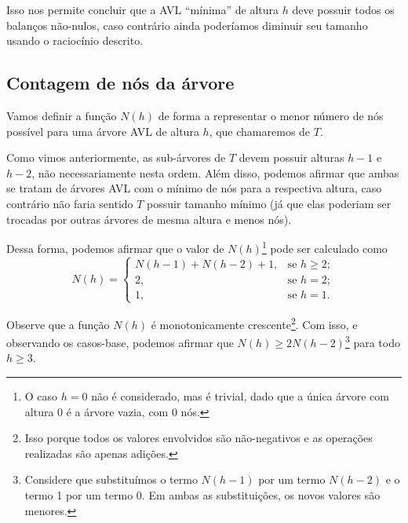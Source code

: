 \documentclass[10pt,a4paper,twoside]{article}
\theoremstyle{definition}
\begin{document}
      \begin{figure}[hbt]
        \caption{\label{fig:troca-sarv}}
        \centering
        \begin{tikzpicture}[transform shape, scale=.9, nodes={draw, circle, minimum width=3.5ex}, sibling distance=5.5em, level distance=6ex]
        \end{tikzpicture}
      \end{figure}

      Isso nos permite concluir que a AVL ``mínima'' de altura \( h \) deve possuir todos os balanços não-nulos, caso contrário ainda poderíamos diminuir seu tamanho usando o raciocínio descrito.

    \subsection{Contagem de nós da árvore}
      \label{str:contagem-nos}

      Vamos definir a função \( N(h) \) de forma a representar o menor número de nós possível para uma árvore AVL de altura \( h \), que chamaremos de \( T \).

      Como vimos anteriormente, as sub-árvores de \( T \) devem possuir alturas \( h-1 \) e \( h-2 \), não necessariamente nesta ordem. Além disso, podemos afirmar que ambas se tratam de árvores AVL com o mínimo de nós para a respectiva altura, caso contrário não faria sentido \( T \) possuir tamanho mínimo (já que elas poderiam ser trocadas por outras árvores de mesma altura e menos nós).

      Dessa forma, podemos afirmar que o valor de \( N(h) \)\footnote{O caso \( h = 0 \) não é considerado, mas é trivial, dado que a única árvore com altura 0 é a árvore vazia, com 0 nós.} pode ser calculado como \[ N(h) = \begin{cases}
          N(h-1) + N(h-2) + 1, & \text{se } h \geq 2; \\
          2                  , & \text{se } h = 2;    \\
          1                  , & \text{se } h = 1.
        \end{cases} \]

      Observe que a função \( N(h) \) é monotonicamente crescente\footnote{Isso porque todos os valores envolvidos são não-negativos e as operações realizadas são apenas adições.}. Com isso, e observando os casos-base, podemos afirmar que \( N(h) \geq 2N(h-2) \)\footnote{Considere que substituímos o termo \( N(h-1) \) por um termo \( N(h-2) \) e o termo 1 por um termo 0. Em ambas as substituições, os novos valores são menores.} para todo \( h \geq 3 \).
\end{document}
